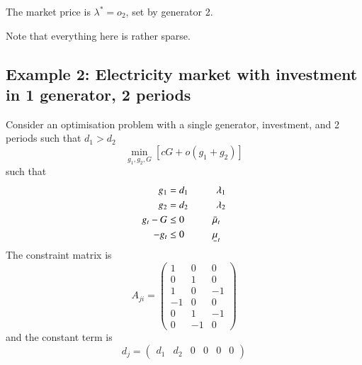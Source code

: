 \documentclass[final,3p,times]{elsarticle}
\newcommand{\ubar}[1]{\text{\b{$#1$}}}
\def\l{\lambda}
\begin{document}
The market price is $\l^* = o_2$, set by generator 2.

Note that everything here is rather sparse.


\subsection{Example 2: Electricity market with investment in 1 generator, 2 periods}

Consider an optimisation problem with a single generator, investment, and 2 periods such that $d_1> d_2$
\begin{equation}
  \min_{g_1,g_2,G} \left[ cG + o(g_1 + g_2)\right]
\end{equation}
such that
\begin{align}
  g_1 & = d_1  \hspace{1cm} \lambda_1 \\
  g_2 & = d_2  \hspace{1cm} \lambda_2 \\
  g_t - G & \leq 0  \hspace{1cm} \bar{\mu}_t \\
  -g_t & \leq 0  \hspace{1cm} \ubar{\mu}_t
\end{align}
The constraint matrix is
\begin{equation}
  A_{ji}=\left(\begin{matrix}
    1 & 0 & 0\\
    0 & 1 & 0 \\
    1 & 0 & -1 \\
     -1 & 0 & 0 \\
     0 & 1 & -1 \\
     0 & -1 & 0
  \end{matrix}\right)
\end{equation}
and the constant term is
\begin{equation}
d_{j}=\left(\begin{matrix}
d_1  & d_2 & 0 & 0 &  0 & 0
\end{matrix}\right)
\end{equation}
\end{document}
